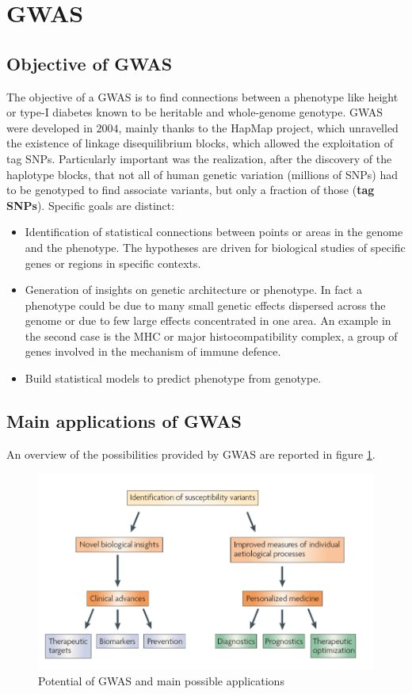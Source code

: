 \section{GWAS}
	\subsection{Objective of GWAS}
	The objective of a GWAS is to find connections between a phenotype like height or type-I diabetes known to be heritable and whole-genome genotype.
	GWAS were developed in $2004$, mainly thanks to the HapMap project, which unravelled the existence of linkage disequilibrium blocks, which allowed the exploitation of tag SNPs.
	Particularly important was the realization, after the discovery of the haplotype blocks, that not all of human genetic variation (millions of SNPs) had to be genotyped to find associate variants, but only a fraction of those (\textbf{tag SNPs}).
	Specific goals are distinct:

	\begin{multicols}{2}
		\begin{itemize}
			\item Identification of statistical connections between points or areas in the genome and the phenotype.
				The hypotheses are driven for biological studies of specific genes or regions in specific contexts.
			\item Generation of insights on genetic architecture or phenotype.
				In fact a phenotype could be due to many small genetic effects dispersed across the genome or due to few large effects concentrated in one area.
				An example in the second case is the MHC or major histocompatibility complex, a group of genes involved in the mechanism of immune defence.
			\item Build statistical models to predict phenotype from genotype.
		\end{itemize}
	\end{multicols}


	\subsection{Main applications of GWAS}
	 An overview of the possibilities provided by GWAS are reported in figure \ref{fig:potential}.
	 \begin{figure}[H]
	 \centering
	 \includegraphics[scale=0.3]{potential}
	 \caption{Potential of GWAS and main possible applications}
	 \label{fig:potential}
	 \end{figure}


